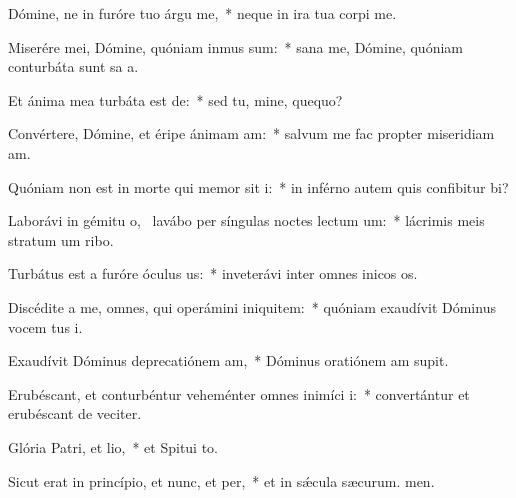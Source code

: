\item Dómine, ne in furóre tuo árgu me,~* neque in ira tua corpi me.
\item Miserére mei, Dómine, quóniam inmus sum:~* sana me, Dómine, quóniam conturbáta sunt sa a.
\item Et ánima mea turbáta est de:~* sed tu, mine, quequo?
\item Convértere, Dómine, et éripe ánimam am:~* salvum me fac propter miseridiam am.
\item Quóniam non est in morte qui memor sit i:~* in inférno autem quis confibitur bi?
\item Laborávi in gémitu o,~\pscross{} lavábo per síngulas noctes lectum um:~* lácrimis meis stratum um ribo.
\item Turbátus est a furóre óculus us:~* inveterávi inter omnes inicos os.
\item Discédite a me, omnes, qui operámini iniquitem:~* quóniam exaudívit Dóminus vocem tus i.
\item Exaudívit Dóminus deprecatiónem am,~* Dóminus oratiónem am supit.
\item Erubéscant, et conturbéntur veheménter omnes inimíci i:~* convertántur et erubéscant de veciter.
\item Glória Patri, et lio,~* et Spitui to.
\item Sicut erat in princípio, et nunc, et per,~* et in sǽcula sæcurum. men.
